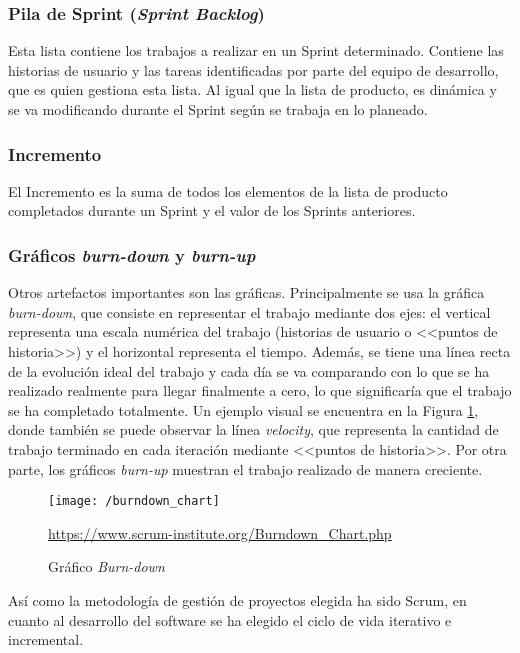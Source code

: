 \subsubsection{Pila de Sprint (\textit{Sprint Backlog})}
Esta lista \cite{Gomez2017} contiene los trabajos a realizar en un Sprint determinado. Contiene las historias de usuario y las tareas identificadas por parte del equipo de desarrollo, que es quien gestiona esta lista. Al igual que la lista de producto, es dinámica y se va modificando durante el Sprint según se trabaja en lo planeado.

\subsubsection{Incremento}
El Incremento \cite{Schwaber2017} es la suma de todos los elementos de la lista de producto completados durante un Sprint y el valor de los Sprints anteriores.

\subsubsection{Gráficos \textit{burn-down} y \textit{burn-up}}
Otros artefactos importantes son las gráficas. Principalmente se usa la gráfica \textit{burn-down}, que  consiste en representar el trabajo mediante dos ejes: el vertical representa una escala numérica del trabajo (historias de usuario o <<puntos de historia>>) y el horizontal representa el tiempo. Además, se tiene una línea recta de la evolución ideal del trabajo y cada día se va comparando con lo que se ha realizado realmente para llegar finalmente a cero, lo que significaría que el trabajo se ha completado totalmente. Un ejemplo visual se encuentra en la Figura \ref{fig:burndown}, donde también se puede observar la línea \textit{velocity}, que representa la cantidad de trabajo terminado en cada iteración mediante <<puntos de historia>>. Por otra parte, los gráficos \textit{burn-up} muestran el trabajo realizado de manera creciente.

\begin{figure}[!h]
	\begin{center}
		\texttt{[image: /burndown\_chart]}
		\caption{Gráfico \textit{Burn-down}}
		\label{fig:burndown}{\url{https://www.scrum-institute.org/Burndown_Chart.php}}
	\end{center}
\end{figure}

\newpage

Así como la metodología de gestión de proyectos elegida ha sido Scrum, en cuanto al desarrollo del software se ha elegido el ciclo de vida iterativo e incremental.

